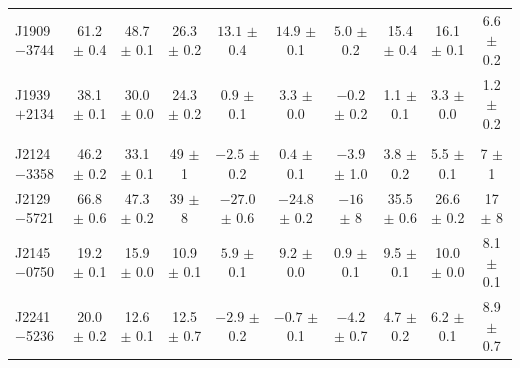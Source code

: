 \begin{landscape}
\begin{table}
\begin{center}
\begin{tabular}{lccccccccc}
J1909$-$3744& 61.2 $\pm$ 0.4& 48.7 $\pm $ 0.1& 26.3 $\pm$ 0.2&$ 13.1$ $\pm$ 0.4 &$ 14.9$ $\pm$ 0.1 &$  5.0$ $\pm$ 0.2 & 15.4 $\pm$ 0.4 & 16.1 $\pm$ 0.1 & 6.6  $\pm$ 0.2 \\
J1939$+$2134& 38.1 $\pm$ 0.1& 30.0 $\pm $ 0.0& 24.3 $\pm$ 0.2&$ 0.9 $ $\pm$ 0.1 &$  3.3$ $\pm$ 0.0 &$ -0.2$ $\pm$ 0.2 &  1.1 $\pm$ 0.1 &  3.3 $\pm$ 0.0 & 1.2  $\pm$ 0.2 \\
            &               &                &               &                  &                  &                  &                &                &               \\
J2124$-$3358& 46.2 $\pm$ 0.2& 33.1 $\pm $ 0.1& 49   $\pm$ 1  &$ -2.5$ $\pm$ 0.2 &$  0.4$ $\pm$ 0.1 &$ -3.9$ $\pm$ 1.0 &  3.8 $\pm$ 0.2 &  5.5 $\pm$ 0.1 & 7    $\pm$ 1   \\
J2129$-$5721& 66.8 $\pm$ 0.6& 47.3 $\pm $ 0.2& 39   $\pm$ 8  &$-27.0$ $\pm$ 0.6 &$-24.8$ $\pm$ 0.2 &$ -16 $ $\pm$ 8   & 35.5 $\pm$ 0.6 & 26.6 $\pm$ 0.2 & 17   $\pm$ 8  \\
J2145$-$0750& 19.2 $\pm$ 0.1& 15.9 $\pm $ 0.0& 10.9 $\pm$ 0.1&$  5.9$ $\pm$ 0.1 &$  9.2$ $\pm$ 0.0 &$  0.9$ $\pm$ 0.1 &  9.5 $\pm$ 0.1 & 10.0 $\pm$ 0.0 & 8.1  $\pm$ 0.1 \\
J2241$-$5236& 20.0 $\pm$ 0.2& 12.6 $\pm $ 0.1& 12.5 $\pm$ 0.7&$ -2.9$ $\pm$ 0.2 &$ -0.7$ $\pm$ 0.1 &$ -4.2$ $\pm$ 0.7 &  4.7 $\pm$ 0.2 &  6.2 $\pm$ 0.1 & 8.9  $\pm$ 0.7 \\
\hline
\end{tabular}
\end{center}
\end{table}
\end{landscape}

